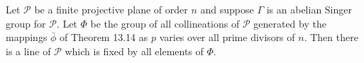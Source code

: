 Let $\mathcal{P}$ be a finite projective plane of order $n$ and suppose $\Gamma$ is an abelian Singer group for $\mathcal{P}$. Let $\Phi$ be the group of all collineations of $\mathcal{P}$ generated by the mappings $\bar{\phi}$ of Theorem 13.14 as $p$ varies over all prime divisors of $n$. Then there is a line of $\mathcal{P}$ which is fixed by all elements of $\Phi$.
